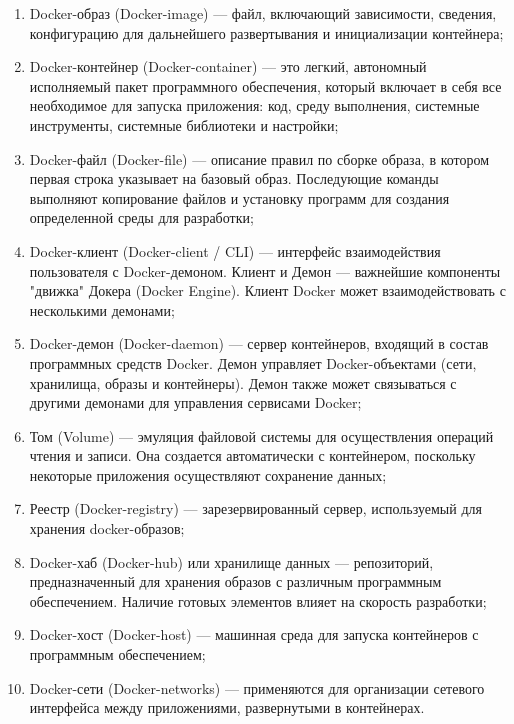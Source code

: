 \begin{enumerate}
	\item Docker-образ (Docker-image) — файл, включающий зависимости, сведения, конфигурацию для дальнейшего развертывания и инициализации контейнера;
	\item Docker-контейнер (Docker-container) — это легкий, автономный исполняемый пакет программного обеспечения, который включает в себя все необходимое для запуска приложения: код, среду выполнения, системные инструменты, системные библиотеки и настройки;
	\item Docker-файл (Docker-file) — описание правил по сборке образа, в котором первая строка указывает на базовый образ. Последующие команды выполняют копирование файлов и установку программ для создания определенной среды для разработки;
	\item Docker-клиент (Docker-client / CLI) — интерфейс взаимодействия пользователя с Docker-демоном. Клиент и Демон — важнейшие компоненты "движка" Докера (Docker Engine). Клиент Docker может взаимодействовать с несколькими демонами;
	\item Docker-демон (Docker-daemon) — сервер контейнеров, входящий в состав программных средств Docker. Демон управляет Docker-объектами (сети, хранилища, образы и контейнеры). Демон также может связываться с другими демонами для управления сервисами Docker;
	\item Том (Volume) — эмуляция файловой системы для осуществления операций чтения и записи. Она создается автоматически с контейнером, поскольку некоторые приложения осуществляют сохранение данных;
	\item Реестр (Docker-registry) — зарезервированный сервер, используемый для хранения docker-образов;
	\item Docker-хаб (Docker-hub) или хранилище данных — репозиторий, предназначенный для хранения образов с различным программным обеспечением. Наличие готовых элементов влияет на скорость разработки;
	\item Docker-хост (Docker-host) — машинная среда для запуска контейнеров с программным обеспечением;
	\item Docker-сети (Docker-networks) — применяются для организации сетевого интерфейса между приложениями, развернутыми в контейнерах.
\end{enumerate}
\noteattributes{}

